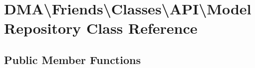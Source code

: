 \hypertarget{classDMA_1_1Friends_1_1Classes_1_1API_1_1ModelRepository}{}\section{D\+M\+A\textbackslash{}Friends\textbackslash{}Classes\textbackslash{}A\+P\+I\textbackslash{}Model\+Repository Class Reference}
\label{classDMA_1_1Friends_1_1Classes_1_1API_1_1ModelRepository}
\subsection*{Public Member Functions}
